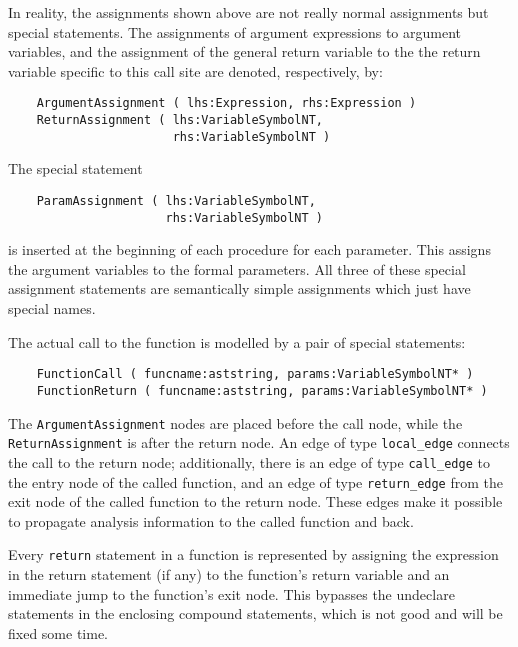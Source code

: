 \documentclass[12pt]{article}
\begin{document}

In reality, the assignments shown above are not really normal
assignments but special statements. The assignments of argument
expressions to argument variables, and the assignment of the general
return variable to the the return variable specific to this call
site are denoted, respectively, by:
\begin{verbatim}
    ArgumentAssignment ( lhs:Expression, rhs:Expression )
    ReturnAssignment ( lhs:VariableSymbolNT,
                       rhs:VariableSymbolNT )
\end{verbatim}

The special statement
\begin{verbatim}
    ParamAssignment ( lhs:VariableSymbolNT,
                      rhs:VariableSymbolNT )
\end{verbatim}
is inserted at the beginning of each procedure for each parameter.
This assigns the argument variables to the formal parameters. All
three of these special assignment statements are semantically simple
assignments which just have special names.

The actual call to the function is modelled by a pair of special
statements:
\begin{verbatim}
    FunctionCall ( funcname:aststring, params:VariableSymbolNT* )
    FunctionReturn ( funcname:aststring, params:VariableSymbolNT* )
\end{verbatim}
The \verb|ArgumentAssignment| nodes are placed before the call node,
while the \verb|ReturnAssignment| is after the return node. An edge
of type \verb|local_edge| connects the call to the return node;
additionally, there is an edge of type \verb|call_edge| to the entry
node of the called function, and an edge of type \verb|return_edge|
from the exit node of the called function to the return node. These
edges make it possible to propagate analysis information to the
called function and back.

Every \lstinline|return| statement in a function is represented by
assigning the expression in the return statement (if any) to the
function's return variable and an immediate jump to the function's
exit node. This bypasses the undeclare statements in the enclosing
compound statements, which is not good and will be fixed some time.
\end{document}
